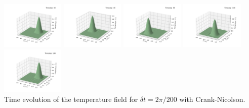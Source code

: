 \begin{center}
\includegraphics[width=3cm]{python_codes/fieldstone_43/images/solution_0000.pdf}
\includegraphics[width=3cm]{python_codes/fieldstone_43/images/solution_0049.pdf}
\includegraphics[width=3cm]{python_codes/fieldstone_43/images/solution_0099.pdf}
\includegraphics[width=3cm]{python_codes/fieldstone_43/images/solution_0149.pdf}
\includegraphics[width=3cm]{python_codes/fieldstone_43/images/solution_0199.pdf}\\
{\small Time evolution of the temperature field for $\delta t=2\pi/200$ with Crank-Nicolson.}
\end{center}

